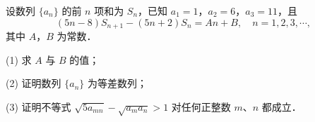 \begin{question}
设数列 $\{a_n\}$ 的前 $n$ 项和为 $S_n$，已知 $a_1 = 1$，$a_2 = 6$，$a_3 = 11$，且
\nopagebreak[4]
\[
(5n - 8)S_{n+1} - (5n + 2)S_n = An + B,\quad n = 1, 2, 3, \cdots,
\]
其中 $A$，$B$ 为常数．

(1) 求 $A$ 与 $B$ 的值；

(2) 证明数列 $\{a_n\}$ 为等差数列；

(3) 证明不等式 $\sqrt{5a_{mn}} - \sqrt{a_m a_n} > 1$ 对任何正整数 $m$、$n$ 都成立．

\end{question}